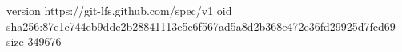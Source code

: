 version https://git-lfs.github.com/spec/v1
oid sha256:87e1c744eb9ddc2b28841113e5e6f567ad5a8d2b368e472e36fd29925d7fcd69
size 349676
